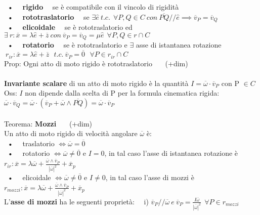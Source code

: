 \documentclass{article}
\begin{document}
\ • \ \ \textbf{rigido} \ \ se è compatibile con il vincolo di rigidità \\
\ • \ \ \textbf{rototraslatorio} \ \ se $ \exists \hat{e} \ t.c. \ \ \forall P,Q \in C \ con \ \overline{PQ} /\!\!/ \hat{e} \implies \overline{v}_P = \overline{v}_Q$ \\
\ • \ \ \textbf{elicoidale} \ \  se è rototraslatorio ed $\exists \ r: \overline{x}=\lambda\hat{e} + \overline{z} \ con \ \overline{v}_P = \overline{v}_Q = \mu \hat{e} \ \ \forall P,Q \in r\cap C$\\
\ • \ \ \textbf{rotatorio} \ \ se è rototraslatorio e $\exists$ asse di istantanea rotazione $ \ r_{ir}: \overline{x}=\lambda\hat{e} + \overline{z} \ \ \ t.c. \ \overline{v}_P = \overline{0} \ \ \ \forall P\in r_{ir} \cap C \ $ \\
%
Prop: Ogni atto di moto rigido è rototraslatorio \ \ \ (+dim)\\ \\
%
%
%
\textbf{Invariante scalare} di un atto di moto rigido è la quantità $I=\overline{\omega}\cdot\overline{v}_P$ con P $\in C$ \\
Oss: $I$ non dipende dalla scelta di P per la formula cinematica rigida: $\overline{\omega}\cdot\overline{v}_Q = \overline{\omega}\cdot(\overline{v}_P+\overline{\omega}\wedge\overline{PQ})=\overline{\omega}\cdot\overline{v}_P$ \\ \\
%
%
Teorema: \textbf{Mozzi} \ \ \ (+dim) \\
\phantom{\ }Un atto di moto rigido di velocità angolare $\overline{\omega}$ è:\\
\ • \ \ traslatorio $\Longleftrightarrow \overline{\omega}=\overline{0}$ \\
\ • \ \ rotatorio $\Longleftrightarrow \overline{\omega} \neq \overline{0}$ e $I=0$, in tal caso l'asse di istantanea rotazione è $r_{ir}: \overline{x}=\lambda\overline{\omega} + \frac{\overline{\omega} \wedge \overline{v}_P}{|\overline{\omega}|^2}+\overline{x}_p $ \\
\ • \ \ elicoidale $\Longleftrightarrow \overline{\omega} \neq \overline{0} $ e $I\neq0$, in tal caso l'asse di mozzi è $r_{mozzi}: \overline{x}=\lambda\overline{\omega} + \frac{\overline{\omega} \wedge \overline{v}_P}{|\overline{\omega}|^2}+\overline{x}_p $\\
\phantom{\ }L'\textbf{asse di mozzi} ha le seguenti proprietà: \ \
i) $\overline{v}_P /\!\!/ \overline{\omega} \ e\ \overline{v}_P = \frac{I\overline{\omega}}{|\overline{\omega}|^2} \ \ \forall P \in r_{mozzi}$ \\
\end{document}
